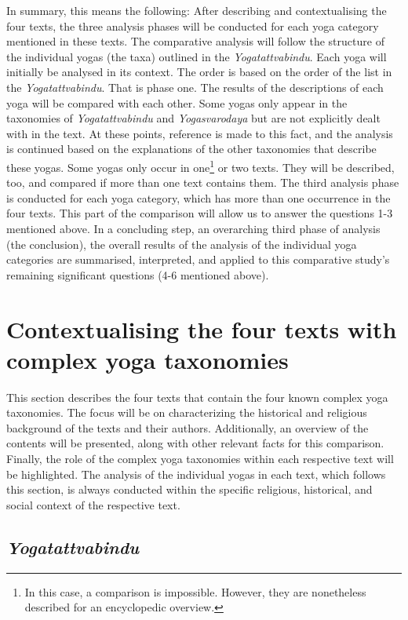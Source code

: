 In summary, this means the following: After describing and contextualising the four texts, the three analysis phases will be conducted for each yoga category mentioned in these texts. The comparative analysis will follow the structure of the individual yogas (the taxa) outlined in the \textit{Yogatattvabindu}. Each yoga will initially be analysed in its context. The order is based on the order of the list in the \textit{Yogatattvabindu}. That is phase one. The results of the descriptions of each yoga will be compared with each other. Some yogas only appear in the taxonomies of \textit{Yogatattvabindu} and \textit{Yogasvarodaya} but are not explicitly dealt with in the text. At these points, reference is made to this fact, and the analysis is continued based on the explanations of the other taxonomies that describe these yogas. Some yogas only occur in one\footnote{In this case, a comparison is impossible. However, they are nonetheless described for an encyclopedic overview.} or two texts. They will be described, too, and compared if more than one text contains them. The third analysis phase is conducted for each yoga category, which has more than one occurrence in the four texts. This part of the comparison will allow us to answer the questions 1-3 mentioned above. In a concluding step, an overarching third phase of analysis (the conclusion), the overall results of the analysis of the individual yoga categories are summarised, interpreted, and applied to this comparative study's remaining significant questions (4-6 mentioned above). 

\section{Contextualising the four texts with complex yoga taxonomies}

This section describes the four texts that contain the four known complex yoga taxonomies. The focus will be on characterizing the historical and religious background of the texts and their authors. Additionally, an overview of the contents will be presented, along with other relevant facts for this comparison. Finally, the role of the complex yoga taxonomies within each respective text will be highlighted. The analysis of the individual yogas in each text, which follows this section, is always conducted within the specific religious, historical, and social context of the respective text. 

\subsection{\emph{Yogatattvabindu}}

